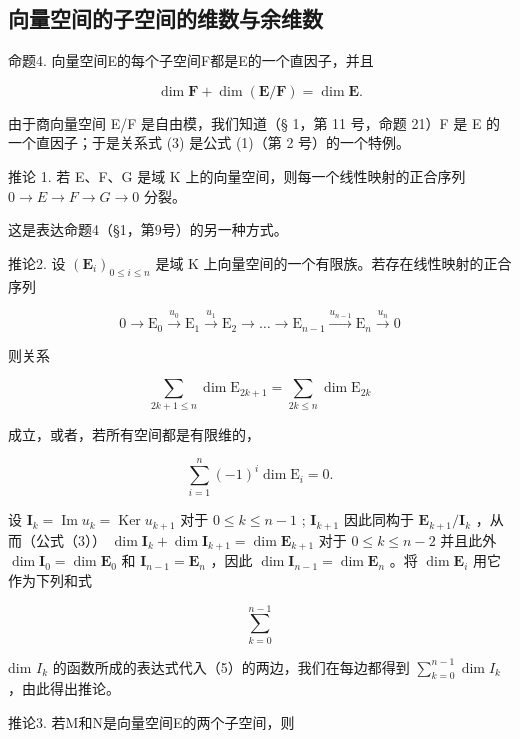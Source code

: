 \subsection{向量空间的子空间的维数与余维数}

命题4. 向量空间E的每个子空间F都是E的一个直因子，并且

\[
\dim \mathbf {F} + \dim (\mathbf {E} / \mathbf {F}) = \dim \mathbf {E}.\tag{3}
\]

由于商向量空间 E/F 是自由模，我们知道（§ 1，第 11 号，命题 21）F 是 E 的一个直因子；于是关系式 (3) 是公式 (1)（第 2 号）的一个特例。

推论 1. 若 E、F、G 是域 K 上的向量空间，则每一个线性映射的正合序列 \(0 \rightarrow E \rightarrow F \rightarrow G \rightarrow 0\) 分裂。

这是表达命题4（§1，第9号）的另一种方式。

推论2. 设 \((\mathbf{E}_i)_{0\leqslant i\leqslant n}\) 是域 K 上向量空间的一个有限族。若存在线性映射的正合序列

\[
0 \longrightarrow \mathrm{E} _ {0} \stackrel {u _ {0}} {\longrightarrow} \mathrm{E} _ {1} \stackrel {u _ {1}} {\longrightarrow} \mathrm{E} _ {2} \longrightarrow \dots \longrightarrow \mathrm{E} _ {n - 1} \stackrel {u _ {n - 1}} {\longrightarrow} \mathrm{E} _ {n} \stackrel {u _ {n}} {\longrightarrow} 0\tag{4}
\]

则关系

\[
\sum_ {2 k + 1 \leqslant n} \dim \mathrm{E} _ {2 k + 1} = \sum_ {2 k \leqslant n} \dim \mathrm{E} _ {2 k}\tag{5}
\]

成立，或者，若所有空间都是有限维的，

\[
\sum_ {i = 1} ^ {n} (- 1) ^ {i} \dim \mathrm{E} _ {i} = 0.\tag{6}
\]

设 \(\mathbf{I}_k = \operatorname{Im} u_k = \operatorname{Ker} u_{k+1}\) 对于 \(0 \leqslant k \leqslant n-1\) ; \(\mathbf{I}_{k+1}\) 因此同构于 \(\mathbf{E}_{k+1}/\mathbf{I}_k\) ，从而（公式（3）） \(\dim \mathbf{I}_k + \dim \mathbf{I}_{k+1} = \dim \mathbf{E}_{k+1}\) 对于 \(0 \leqslant k \leqslant n-2\) 并且此外 \(\dim \mathbf{I}_0 = \dim \mathbf{E}_0\) 和 \(\mathbf{I}_{n-1} = \mathbf{E}_n\) ，因此 \(\dim \mathbf{I}_{n-1} = \dim \mathbf{E}_n\) 。将 \(\dim \mathbf{E}_i\) 用它作为下列和式

\[
\sum_ {k = 0} ^ {n - 1}
\]

dim \(I_{k}\) 的函数所成的表达式代入（5）的两边，我们在每边都得到 \(\sum_{k=0}^{n-1}\dim I_{k}\) ，由此得出推论。

推论3. 若M和N是向量空间E的两个子空间，则

